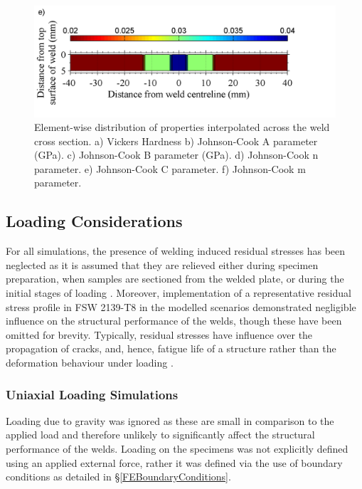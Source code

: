 \begin{figure}
	\includegraphics[width=1\linewidth]{JCCaltered}
	\caption[Mesh]{Element-wise distribution of properties interpolated across the weld cross section. a) Vickers Hardness b) Johnson-Cook A parameter (GPa). c) Johnson-Cook B parameter (GPa). d) Johnson-Cook n parameter. e) Johnson-Cook C parameter. f) Johnson-Cook m parameter.}
	\label{fig:colormaps}
\end{figure} 

\subsection{Loading Considerations}
\label{FELoadingConsiderations}
For all simulations, the presence of welding induced residual stresses has been neglected as it is assumed that they are relieved either during specimen preparation, when samples are sectioned from the welded plate, or during the initial stages of loading \cite{Peel2003}. Moreover, implementation of a representative residual stress profile in FSW 2139-T8 \cite{Grujicic2011a} in the modelled scenarios demonstrated negligible influence on the structural performance of the welds, though these have been omitted for brevity. Typically, residual stresses have influence over the propagation of cracks, and, hence, fatigue life of a structure rather than the deformation behaviour under loading \cite{Jata2000}. 
\subsubsection{Uniaxial Loading Simulations}
\label{FEUniaxialTension}
Loading due to gravity was ignored as these are small in comparison to the applied load and therefore unlikely to significantly affect the structural performance of the welds. Loading on the specimens was not explicitly defined using an applied external force, rather it was defined via the use of boundary conditions as detailed in \S\ref{FEBoundaryConditions}.
